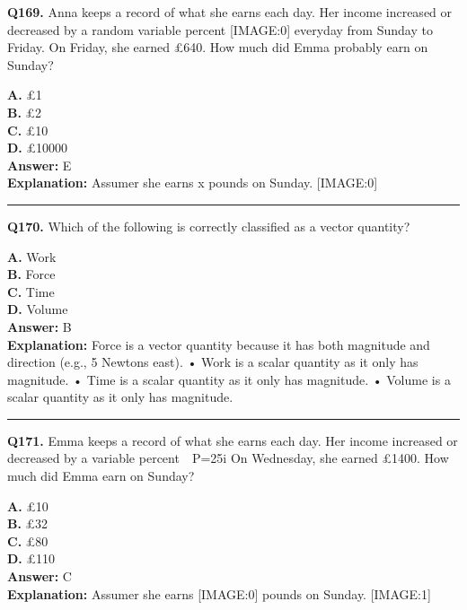 \documentclass[12pt]{article}
\begin{document}
\noindent
\textbf{Q169.} Anna keeps a record of what she earns each day.
Her income increased or decreased by a random variable percent
[IMAGE:0]
everyday from Sunday to Friday.
On Friday, she earned £640. How much did Emma probably earn on Sunday?



\textbf{A.} £1 \\
\textbf{B.} £2 \\
\textbf{C.} £10 \\
\textbf{D.} £10000 \\

\textbf{Answer:} E \\
\textbf{Explanation:} Assumer she earns x
pounds on Sunday.
[IMAGE:0]

\hrule
\vspace{1em}


\noindent
\textbf{Q170.} Which of the following is correctly classified as a vector quantity?



\textbf{A.} Work \\
\textbf{B.} Force \\
\textbf{C.} Time \\
\textbf{D.} Volume \\

\textbf{Answer:} B \\
\textbf{Explanation:} Force is a vector quantity because it has both magnitude and direction (e.g., 5 Newtons east).
• Work is a scalar quantity as it only has magnitude.
• Time is a scalar quantity as it only has magnitude.
• Volume is a scalar quantity as it only has magnitude.

\hrule
\vspace{1em}


\noindent
\textbf{Q171.} Emma keeps a record of what she earns each day.
Her income increased or decreased by a variable percent  P=25i%
On Wednesday, she earned £1400. How much did Emma earn on Sunday?



\textbf{A.} £10 \\
\textbf{B.} £32 \\
\textbf{C.} £80 \\
\textbf{D.} £110 \\

\textbf{Answer:} C \\
\textbf{Explanation:} Assumer she earns
[IMAGE:0]
pounds on Sunday.
[IMAGE:1]
\end{document}
